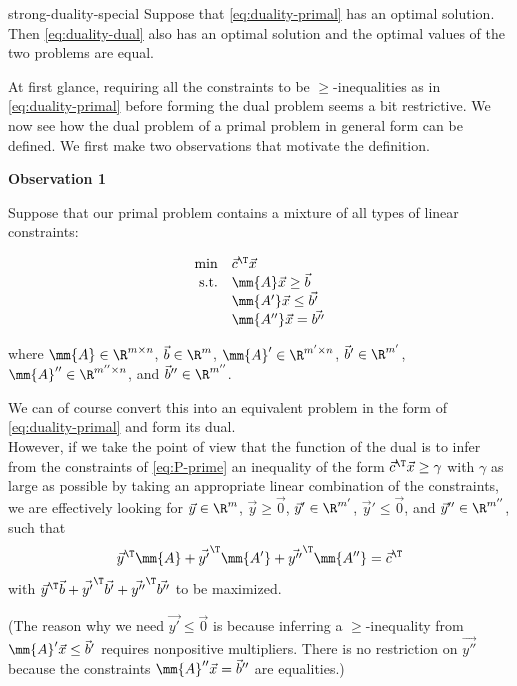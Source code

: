 \begin{theorem}{strong-duality-special}{}
\protect\hypertarget{thm:strong-duality-special}{}{\label{thm:strong-duality-special}}
Suppose that \eqref{eq:duality-primal} has an optimal solution. Then
\eqref{eq:duality-dual} also has an optimal solution and the optimal
values of the two problems are equal.
\end{theorem}

At first glance, requiring all the constraints to be
\(\geq\)-inequalities as in \eqref{eq:duality-primal} before forming the
dual problem seems a bit restrictive. We now see how the dual problem of
a primal problem in general form can be defined. We first make two
observations that motivate the definition.

\textbf{Observation 1}

Suppose that our primal problem contains a mixture of all types of
linear constraints:

\begin{equation}
\begin{array}{rl}
\min & \vec{c}^\T\vec{x}  \\
\mbox{s.t.} & \mm{A}\vec{x}\geq \vec{b} \\
& \mm{A'}\vec{x} \leq \vec{b'} \\
& \mm{A''}\vec{x} = \vec{b''}
\end{array} \label{eq:P-prime}
\end{equation}

where \(\mm{A} \in \R^{m\times n}\), \(\vec{b} \in \R^{m}\),
\(\mm{A}' \in \R^{m'\times n}\), \(\vec{b}' \in \R^{m'}\),
\(\mm{A}'' \in \R^{m''\times n}\), and \(\vec{b}'' \in \R^{m''}\).

We can of course convert this into an equivalent problem in the form of
\eqref{eq:duality-primal} and form its dual.\\
However, if we take the point of view that the function of the dual is
to infer from the constraints of \eqref{eq:P-prime} an inequality of the
form \(\vec{c}^\T \vec{x} \geq \gamma\) with \(\gamma\) as large as
possible by taking an appropriate linear combination of the constraints,
we are effectively looking for \(\vec{y} \in \R^{m}\),
\(\vec{y} \geq \vec{0}\), \(\vec{y}' \in \R^{m'}\),
\(\vec{y}' \leq \vec{0}\), and \(\vec{y}'' \in \R^{m''}\), such that
\[\vec{y}^\T\mm{A}
+\vec{y'}^\T\mm{A'}
+\vec{y''}^\T\mm{A''} = \vec{c}^\T\] with
\(\vec{y}^\T\vec{b} +\vec{y'}^\T\vec{b'} +\vec{y''}^\T\vec{b''}\) to be
maximized.

(The reason why we need \(\vec{y'} \leq \vec{0}\) is because inferring a
\(\geq\)-inequality from \(\mm{A}'\vec{x} \leq \vec{b}'\) requires
nonpositive multipliers. There is no restriction on \(\vec{y''}\)
because the constraints \(\mm{A}''\vec{x} = \vec{b}''\) are equalities.)

